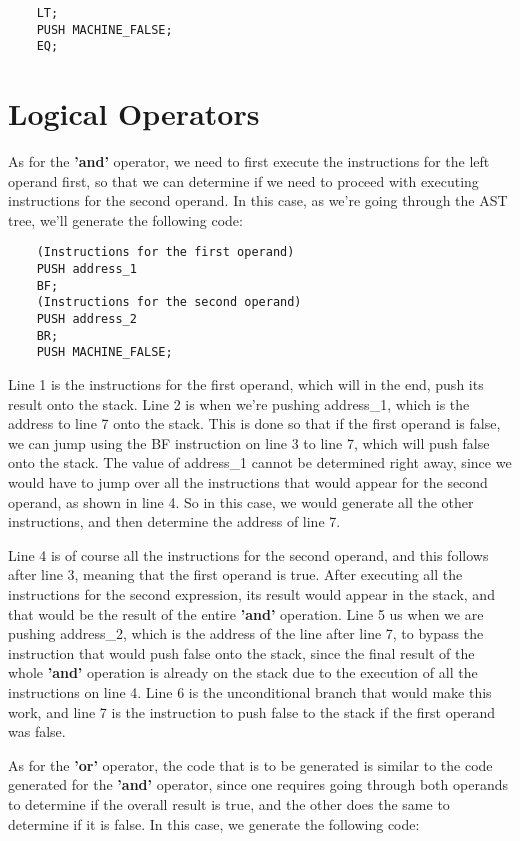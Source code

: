 \documentclass{article}
\begin{document}
\begin{lstlisting}
    LT;
    PUSH MACHINE_FALSE;
    EQ;
\end{lstlisting}

\section{Logical Operators}

As for the \textbf{'and'} operator, we need to first execute the instructions for the left operand first, so that we can determine if we need to proceed with executing instructions for the second operand. In this case, as we're going through the AST tree, we'll generate the following code:

\begin{lstlisting}
    (Instructions for the first operand)
    PUSH address_1
    BF;
    (Instructions for the second operand)
    PUSH address_2
    BR;
    PUSH MACHINE_FALSE;
\end{lstlisting}

Line 1 is the instructions for the first operand, which will in the end, push its result onto the stack. Line 2 is when we're pushing address\_1, which is the address to line 7 onto the stack. This is done so that if the first operand is false, we can jump using the BF instruction on line 3 to line 7, which will push false onto the stack. The value of address\_1 cannot be determined right away, since we would have to jump over all the instructions that would appear for the second operand, as shown in line 4. So in this case, we would generate all the other instructions, and then determine the address of line 7.

Line 4 is of course all the instructions for the second operand, and this follows after line 3, meaning that the first operand is true. After executing all the instructions for the second expression, its result would appear in the stack, and that would be the result of the entire \textbf{'and'} operation. Line 5 us when we are pushing address\_2, which is the address of the line after line 7, to bypass the instruction that would push false onto the stack, since the final result of the whole \textbf{'and'} operation is already on the stack due to the execution of all the instructions on line 4. Line 6 is the unconditional branch that would make this work, and line 7 is the instruction to push false to the stack if the first operand was false.

As for the \textbf{'or'} operator, the code that is to be generated is similar to the code generated for the \textbf{'and'} operator, since one requires going through both operands to determine if the overall result is true, and the other does the same to determine if it is false. In this case, we generate the following code:
\end{document}
